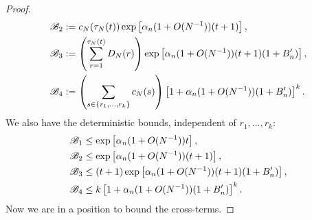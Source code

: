 \documentclass{article}
\newcommand{\1}[1]{\mathbbm{1}_{#1}}
\begin{document}
\begin{proof}
\begin{align}
\mathscr{B}_2 &:= c_N(\tau_N(t)) \exp\left[ \alpha_n (1+O(N^{-1})) (t+1) \right] , \notag\\
\mathscr{B}_3 &:= \left( \sum_{r=1}^{\tau_N(t)} D_N(r) \right) \exp\left[ \alpha_n (1+O(N^{-1})) (t+1) (1+B_n^\prime) \right] , \notag\\
\mathscr{B}_4 &:= \left( \sum_{s\in \{r_1,\dots,r_k\} } c_N(s) \right)
\left[ 1 + \alpha_n (1+O(N^{-1})) (1 + B_n^\prime) \right]^k . \label{eq:106}
\end{align}
We also have the deterministic bounds, independent of $r_1,\dots,r_k$:
\begin{align}
\mathscr{B}_1 &\leq \exp\left[ \alpha_n (1+O(N^{-1})) t \right] , \notag\\
\mathscr{B}_2 &\leq \exp\left[ \alpha_n (1+O(N^{-1})) (t+1) \right] , \notag\\
\mathscr{B}_3 &\leq (t+1) \exp\left[ \alpha_n (1+O(N^{-1})) (t+1) (1+B_n^\prime) \right] , \notag\\
\mathscr{B}_4 &\leq k \left[ 1 + \alpha_n (1+O(N^{-1})) (1 + B_n^\prime) \right]^k . \label{eq:107}
\end{align}
Now we are in a position to bound the cross-terms.


\end{proof}
\end{document}
